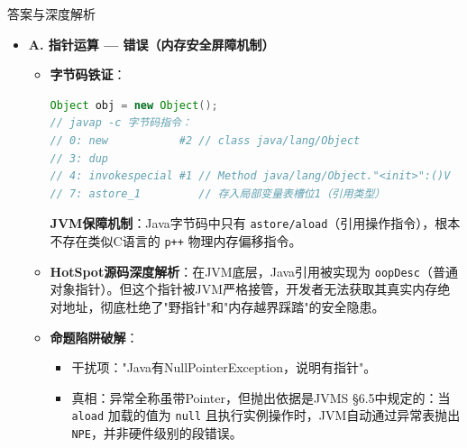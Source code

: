 \documentclass[12pt, a4paper]{ctexart}
\begin{document}
\begin{enumerate}[label=\textbf{\arabic*.}]
\begin{bluebox}{答案与深度解析}
		      \begin{itemize}[leftmargin=*]
			      \item \textbf{A. 指针运算 — 错误（内存安全屏障机制）}
			            \begin{itemize}[leftmargin=*, nosep]
				            \item \textbf{字节码铁证}：
				                  \begin{lstlisting}[language=Java]
Object obj = new Object();
// javap -c 字节码指令：
// 0: new           #2 // class java/lang/Object
// 3: dup
// 4: invokespecial #1 // Method java/lang/Object."<init>":()V
// 7: astore_1         // 存入局部变量表槽位1（引用类型）
\end{lstlisting}
				                  \textbf{JVM保障机制}：Java字节码中只有 \texttt{astore/aload}（引用操作指令），根本不存在类似C语言的 \texttt{p++} 物理内存偏移指令。
				            \item \textbf{HotSpot源码深度解析}：在JVM底层，Java引用被实现为 \texttt{oopDesc}（普通对象指针）。但这个指针被JVM严格接管，开发者无法获取其真实内存绝对地址，彻底杜绝了"野指针"和"内存越界踩踏"的安全隐患。
				            \item \textbf{命题陷阱破解}：
				                  \begin{itemize}
					                  \item 干扰项："Java有NullPointerException，说明有指针"。
					                  \item 真相：异常全称虽带Pointer，但抛出依据是JVMS §6.5中规定的：当 \texttt{aload} 加载的值为 \texttt{null} 且执行实例操作时，JVM自动通过异常表抛出 \texttt{NPE}，并非硬件级别的段错误。
				                  \end{itemize}
			            \end{itemize}


\end{itemize}
\end{bluebox}
\end{enumerate}
\end{document}
